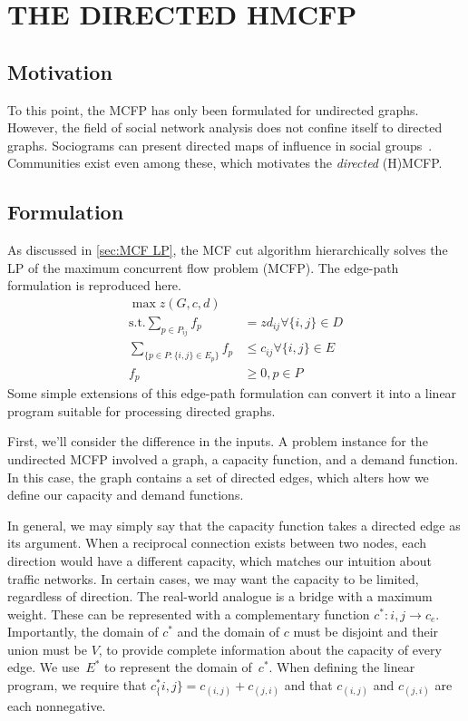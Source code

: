 \chapter{THE DIRECTED HMCFP} \label{ch:directed}%

\section{Motivation}

To this point, the MCFP has only been formulated for undirected graphs. However, the field of social network analysis does not confine itself to directed graphs. Sociograms can present directed maps of influence in social groups~\cite{moreno1934shall}. Communities exist even among these, which motivates the \emph{directed} (H)MCFP.

\section{Formulation}

As discussed in \autoref{sec:MCF LP}, the MCF cut algorithm hierarchically solves the LP of the maximum concurrent flow problem (MCFP). The edge-path formulation is reproduced here.
\begin{align}
    \max z(G, c, d) \\
    \mathrm{s.t.} \sum_{p \in P_{ij}} f_p &= zd_{ij} \forall \{i, j\} \in D \\
    \sum_{\{p \in P:\{i,j\} \in E_p\}} f_p &\leq c_{ij} \forall \{i, j\} \in E \\
    f_p &\geq 0,  p \in P
\end{align}
Some simple extensions of this edge-path formulation can convert it into a linear program suitable for processing directed graphs.

First, we'll consider the difference in the inputs. A problem instance for the undirected MCFP involved a graph, a capacity function, and a demand function. In this case, the graph contains a set of directed edges, which alters how we define our capacity and demand functions. 

In general, we may simply say that the capacity function takes a directed edge as its argument. When a reciprocal connection exists between two nodes, each direction would have a different capacity, which matches our intuition about traffic networks. In certain cases, we may want the capacity to be limited, regardless of direction. The real-world analogue is a bridge with a maximum weight. These can be represented with a complementary function $c^*\colon {i, j} \rightarrow c_e$. Importantly, the domain of $c^*$ and the domain of $c$ must be disjoint and their union must be $V$, to provide complete information about the capacity of every edge. We use~$E^*$ to represent the domain of~$c^*$. When defining the linear program, we require that $c^*_\{i, j\} = c_{(i, j)} + c_{(j, i)}$ and that $c_{(i, j)}$ and $c_{(j, i)}$ are each nonnegative.

